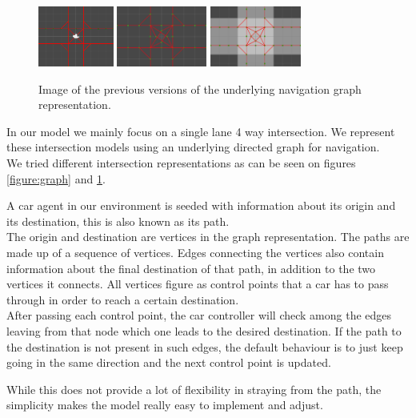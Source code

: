 \begin{figure}
\centering
\includegraphics[height=75px]{img/graph-old1.png}
\includegraphics[height=75px]{img/graph-old2.png}
\includegraphics[height=75px]{img/graph-old3.png}
\caption{Image of the previous versions of the underlying navigation graph representation.}
\label{figure:graphs}
\end{figure}

In our model we mainly focus on a single lane 4 way intersection.
We represent these intersection models using an underlying directed graph for navigation.\\
We tried different intersection representations as can be seen on figures \ref{figure:graph} and \ref{figure:graphs}.

A car agent in our environment is seeded with information about its origin and its destination, this is also known as its path.\\
The origin and destination are vertices in the graph representation.
The paths are made up of a sequence of vertices.
Edges connecting the vertices also contain information about the final destination of that path, in addition to the two vertices it connects.
All vertices figure as control points that a car has to pass through in order to reach a certain destination. \\
After passing each control point, the car controller will check among the edges leaving from that node which one leads to the desired destination.
If the path to the destination is not present in such edges, the default behaviour is to just keep going in the same direction and the next control point is updated.

While this does not provide a lot of flexibility in straying from the path, the simplicity makes the model really easy to implement and adjust.


